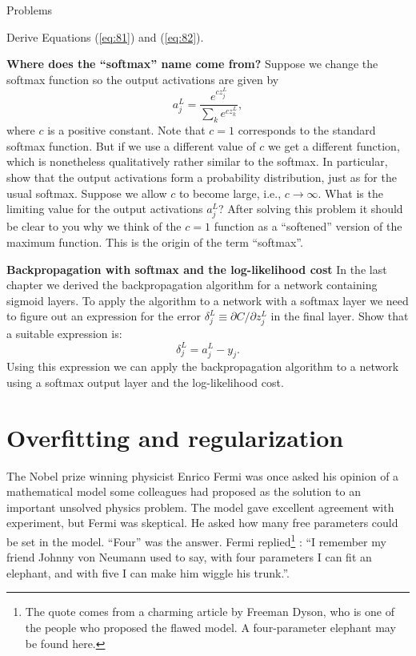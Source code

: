 \documentclass[a4paper,twoside,10pt]{book}
\begin{document}
\begin{exercize}{Problems}
\item Derive Equations (\ref{eq:81}) and (\ref{eq:82}).
\item \textbf{Where does the ``softmax'' name come from?} Suppose we change the softmax function so the output activations are given by
\begin{equation}
	a^L_j = \frac{e^{c z^L_j}}{\sum_k e^{c z^L_k}},\label{eq:83}
\end{equation}
where $c$ is a positive constant. Note that $c=1$ corresponds to the standard softmax function. But if we use a different value of $c$ we get a different function, which is nonetheless qualitatively rather similar to the softmax. In particular, show that the output activations form a probability distribution, just as for the usual softmax. Suppose we allow $c$ to become large, i.e., $c\to \infty$. What is the limiting value for the output activations $a^L_j$? After solving this problem it should be clear to you why we think of the $c=1$ function as a ``softened'' version of the maximum function. This is the origin of the term ``softmax''.
\item \textbf{Backpropagation with softmax and the log-likelihood cost} In the last chapter we derived the backpropagation algorithm for a network containing sigmoid layers. To apply the algorithm to a network with a softmax layer we need to figure out an expression for the error $\delta^L_j \equiv \partial C / \partial z^L_j$ in the final layer. Show that a suitable expression is:
\begin{equation}
\delta^L_j = a^L_j -y_j. \label{eq:84}
\end{equation}
Using this expression we can apply the backpropagation algorithm to a network using a softmax output layer and the log-likelihood cost.
\end{exercize}

\section{Overfitting and regularization}
The Nobel prize winning physicist Enrico Fermi was once asked his opinion of a mathematical model some colleagues had proposed as the solution to an important unsolved physics problem. The model gave excellent agreement with experiment, but Fermi was skeptical. He asked how many free parameters could be set in the model. ``Four'' was the answer. Fermi replied\footnote{The quote comes from a charming article by Freeman Dyson, who is one of the people who proposed the flawed model. A four-parameter elephant may be found here.} : ``I remember my friend Johnny von Neumann used to say, with four parameters I can fit an elephant, and with five I can make him wiggle his trunk.''.
\end{document}
